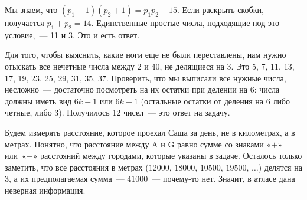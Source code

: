 ﻿
\begin{itemize}
\itA Мы знаем, что $(p_1+1)(p_2+1) = p_1p_2 + 15$. Если раскрыть скобки, получается $p_1 + p_2 = 14$. Единственные простые числа, подходящие под это условие,~— 11 и 3. Это и есть ответ.

\itB Для того, чтобы выяснить, какие ноги еще не были переставлены, нам нужно отыскать все нечетные числа между 2 и 40, не делящиеся на 3. Это 5, 7, 11, 13, 17, 19, 23, 25, 29, 31, 35, 37. Проверить, что мы выписали все нужные числа, несложно~— достаточно посмотреть на их остатки при делении на 6: числа должны иметь вид $6k-1$ или $6k+1$ (остальные остатки от деления на 6 либо четные, либо 3). Получилось 12 чисел~— это ответ на задачу.

\itC Будем измерять расстояние, которое проехал Саша за день, не в километрах, а в метрах. Понятно, что расстояние между A и G равно сумме со знаками «$+$» или~«$-$» расстояний между городами, которые указаны в задаче. Осталось только заметить, что все расстояния в метрах ($12000$, $18000$, $10500$, $19500$, $\ldots$) делятся на 3, а их предполагаемая сумма~— $41000$~— почему-то нет. Значит, в атласе дана неверная информация.
\end{itemize}